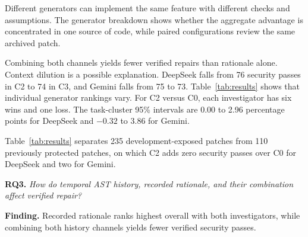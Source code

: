\documentclass[10pt,conference]{IEEEtran}
\newcommand{\rqfinding}[3]{%
  \begin{tcolorbox}[
    colback=rqback, colframe=rqframe,
    boxrule=0.4pt, leftrule=3.5pt, arc=1.5pt,
    left=6pt, right=6pt, top=5pt, bottom=5pt,
    fontupper=\small
  ]
  \textbf{#1.} \emph{#2}\par
  \smallskip
  \textbf{Finding.} #3
  \end{tcolorbox}%
}
\begin{document}
Different generators can implement the same feature with different checks and assumptions. The generator breakdown shows whether the aggregate advantage is concentrated in one source of code, while paired configurations review the same archived patch.

Combining both channels yields fewer verified repairs than rationale alone. Context dilution is a possible explanation. DeepSeek falls from 76 security passes in C2 to 74 in C3, and Gemini falls from 75 to 73. Table~\ref{tab:results} shows that individual generator rankings vary. For C2 versus C0, each investigator has six wins and one loss. The task-cluster 95\% intervals are 0.00 to 2.96 percentage points for DeepSeek and $-0.32$ to 3.86 for Gemini.

Table~\ref{tab:results} separates 235 development-exposed patches from 110 previously protected patches, on which C2 adds zero security passes over C0 for DeepSeek and two for Gemini.

\rqfinding{RQ3}{How do temporal AST history, recorded rationale, and their combination affect verified repair?}{Recorded rationale ranks highest overall with both investigators, while combining both history channels yields fewer verified security passes.}


\clearpage
\newcommand{\BIBdecl}{\interlinepenalty=10000}


\end{document}
